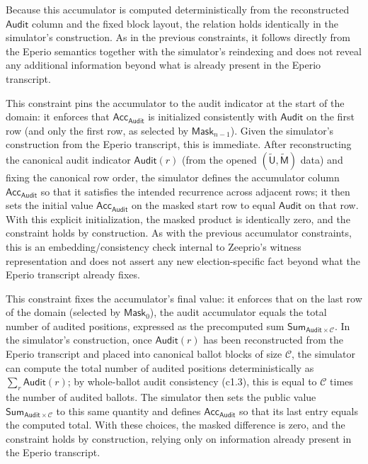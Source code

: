 Because this accumulator is computed deterministically from the reconstructed $\mathsf{Audit}$ column and the fixed block layout, the relation holds identically in the simulator’s construction. As in the previous constraints, it follows directly from the Eperio semantics together with the simulator’s reindexing and does not reveal any additional information beyond what is already present in the Eperio transcript.


This constraint pins the accumulator to the audit indicator at the start of the domain: it enforces that
$\mathsf{Acc}_{\mathsf{Audit}}$ is initialized consistently with $\mathsf{Audit}$ on the first row (and only the first row,
as selected by $\mathsf{Mask}_{n-1}$). Given the simulator’s construction from the Eperio transcript, this is immediate.
After reconstructing the canonical audit indicator $\mathsf{Audit}(r)$ (from the opened $(\widetilde{\mathsf{U}},\widetilde{\mathsf{M}})$
data) and fixing the canonical row order, the simulator defines the accumulator column $\mathsf{Acc}_{\mathsf{Audit}}$
so that it satisfies the intended recurrence across adjacent rows; it then sets the initial value
$\mathsf{Acc}_{\mathsf{Audit}}$ on the masked start row to equal $\mathsf{Audit}$ on that row. With this explicit
initialization, the masked product is identically zero, and the constraint holds by construction. As with the previous
accumulator constraints, this is an embedding/consistency check internal to Zeeprio’s witness representation and does not
assert any new election-specific fact beyond what the Eperio transcript already fixes.


This constraint fixes the accumulator’s final value: it enforces that on the last row of the domain (selected by
$\mathsf{Mask}_{0}$), the audit accumulator equals the total number of audited positions, expressed as the precomputed
sum $\mathsf{Sum}_{\mathsf{Audit}\times\mathcal{C}}$. In the simulator’s construction, once $\mathsf{Audit}(r)$ has been
reconstructed from the Eperio transcript and placed into canonical ballot blocks of size $\mathcal{C}$, the simulator can
compute the total number of audited positions deterministically as $\sum_r \mathsf{Audit}(r)$; by whole-ballot audit
consistency (c1.3), this is equal to $\mathcal{C}$ times the number of audited ballots. The simulator then sets the
public value $\mathsf{Sum}_{\mathsf{Audit}\times\mathcal{C}}$ to this same quantity and defines
$\mathsf{Acc}_{\mathsf{Audit}}$ so that its last entry equals the computed total. With these choices, the masked
difference is zero, and the constraint holds by construction, relying only on information already present in the Eperio
transcript.

